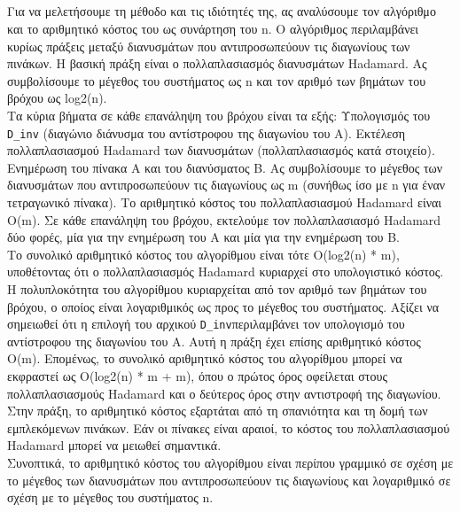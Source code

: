 \documentclass[12pt,a4paper]{article}
\begin{document}
\subsection{}
Για να μελετήσουμε τη μέθοδο και τις ιδιότητές της, ας αναλύσουμε τον αλγόριθμο και το αριθμητικό κόστος του ως συνάρτηση του n. Ο αλγόριθμος περιλαμβάνει κυρίως πράξεις μεταξύ διανυσμάτων που αντιπροσωπεύουν τις διαγωνίους των πινάκων. Η βασική πράξη είναι ο πολλαπλασιασμός διανυσμάτων Hadamard. Ας συμβολίσουμε το μέγεθος του συστήματος ως n και τον αριθμό των βημάτων του βρόχου ως log2(n).\\
Τα κύρια βήματα σε κάθε επανάληψη του βρόχου είναι τα εξής:
Υπολογισμός του \texttt{D\_inv}  (διαγώνιο διάνυσμα του αντίστροφου της διαγωνίου του A).
Εκτέλεση πολλαπλασιασμού Hadamard των διανυσμάτων (πολλαπλασιασμός κατά στοιχείο).
Ενημέρωση του πίνακα A και του διανύσματος B.
Ας συμβολίσουμε το μέγεθος των διανυσμάτων που αντιπροσωπεύουν τις διαγωνίους ως  m  (συνήθως ίσο με n για έναν τετραγωνικό πίνακα). Το αριθμητικό κόστος του πολλαπλασιασμού Hadamard είναι O(m). Σε κάθε επανάληψη του βρόχου, εκτελούμε τον πολλαπλασιασμό Hadamard δύο φορές, μία για την ενημέρωση του A και μία για την ενημέρωση του B.\\
Το συνολικό αριθμητικό κόστος του αλγορίθμου είναι τότε O(log2(n) * m), υποθέτοντας ότι ο πολλαπλασιασμός Hadamard κυριαρχεί στο υπολογιστικό κόστος. Η πολυπλοκότητα του αλγορίθμου κυριαρχείται από τον αριθμό των βημάτων του βρόχου, ο οποίος είναι λογαριθμικός ως προς το μέγεθος του συστήματος.
Αξίζει να σημειωθεί ότι η επιλογή του αρχικού \texttt{D\_inv}περιλαμβάνει τον υπολογισμό του αντίστροφου της διαγωνίου του A. Αυτή η πράξη έχει επίσης αριθμητικό κόστος O(m). Επομένως, το συνολικό αριθμητικό κόστος του αλγορίθμου μπορεί να εκφραστεί ως O(log2(n) * m + m), όπου ο πρώτος όρος οφείλεται στους πολλαπλασιασμούς Hadamard και ο δεύτερος όρος στην αντιστροφή της διαγωνίου.
Στην πράξη, το αριθμητικό κόστος εξαρτάται από τη σπανιότητα και τη δομή των εμπλεκόμενων πινάκων. Εάν οι πίνακες είναι αραιοί, το κόστος του πολλαπλασιασμού Hadamard μπορεί να μειωθεί σημαντικά.\\
Συνοπτικά, το αριθμητικό κόστος του αλγορίθμου είναι περίπου γραμμικό σε σχέση με το μέγεθος των διανυσμάτων που αντιπροσωπεύουν τις διαγωνίους και λογαριθμικό σε σχέση με το μέγεθος του συστήματος n.
\end{document}
